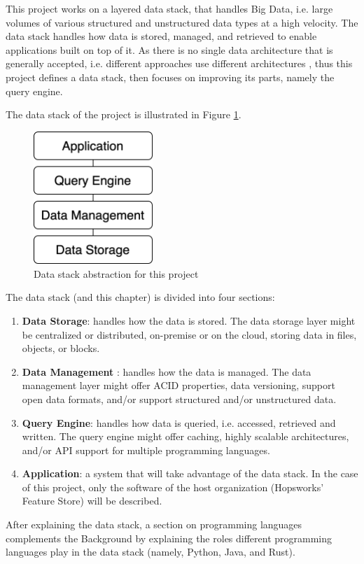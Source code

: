 This project works on a layered data stack, that handles Big Data, i.e. large volumes of various structured and unstructured data types at a high velocity. The data stack handles how data is stored, managed, and retrieved to enable applications built on top of it. 
As there is no single data architecture that is generally accepted, i.e. different approaches use different architectures \cite{framptonCompleteGuideOpen2018,sakrBigDataProcessing2017}, thus this project defines a data stack, then focuses on improving its parts, namely the query engine. 

The data stack of the project is illustrated in Figure \ref{fig:data_stack}.

\begin{figure}[!ht]
    \begin{center}
      \includegraphics[width=0.4\textwidth]{figures/2-background/data_stack.png}
    \end{center}
    \caption{Data stack abstraction for this project}
    \label{fig:data_stack}
\end{figure}

The data stack (and this chapter) is divided into four sections:
\begin{enumerate}
    \item \textbf{Data Storage}: handles how the data is stored. The data storage layer might be centralized or distributed, on-premise or on the cloud, storing data in files, objects, or blocks.
    \item \textbf{Data Management} : handles how the data is managed. The data management layer might offer \gls{ACID} properties, data versioning, support open data formats, and/or support structured and/or unstructured data.
    \item \textbf{Query Engine}: handles how data is queried, i.e. accessed, retrieved and written. The query engine might offer caching, highly scalable architectures, and/or \gls{API} support for multiple programming languages.
    \item \textbf{Application}: a system that will take advantage of the data stack. In the case of this project, only the software of the host organization (Hopsworks' Feature Store) will be described. 
\end{enumerate}
After explaining the data stack, a section on programming languages complements the Background by explaining the roles different programming languages play in the data stack (namely, Python, Java, and Rust).
